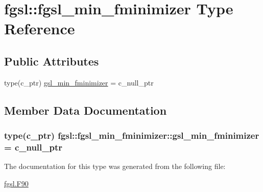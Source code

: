 \hypertarget{structfgsl_1_1fgsl__min__fminimizer}{}\section{fgsl\+:\+:fgsl\+\_\+min\+\_\+fminimizer Type Reference}
\label{structfgsl_1_1fgsl__min__fminimizer}
\subsection*{Public Attributes}
\begin{DoxyCompactItemize}
\item 
type(c\+\_\+ptr) \hyperlink{structfgsl_1_1fgsl__min__fminimizer_a98d1cf001ea5a9c37bfc707481a7c367}{gsl\+\_\+min\+\_\+fminimizer} = c\+\_\+null\+\_\+ptr
\end{DoxyCompactItemize}


\subsection{Member Data Documentation}
\hypertarget{structfgsl_1_1fgsl__min__fminimizer_a98d1cf001ea5a9c37bfc707481a7c367}{}
\subsubsection[{gsl\+\_\+min\+\_\+fminimizer}]{\setlength{\rightskip}{0pt plus 5cm}type(c\+\_\+ptr) fgsl\+::fgsl\+\_\+min\+\_\+fminimizer\+::gsl\+\_\+min\+\_\+fminimizer = c\+\_\+null\+\_\+ptr}\label{structfgsl_1_1fgsl__min__fminimizer_a98d1cf001ea5a9c37bfc707481a7c367}


The documentation for this type was generated from the following file\+:\begin{DoxyCompactItemize}
\item 
\hyperlink{fgsl_8F90}{fgsl.\+F90}\end{DoxyCompactItemize}
